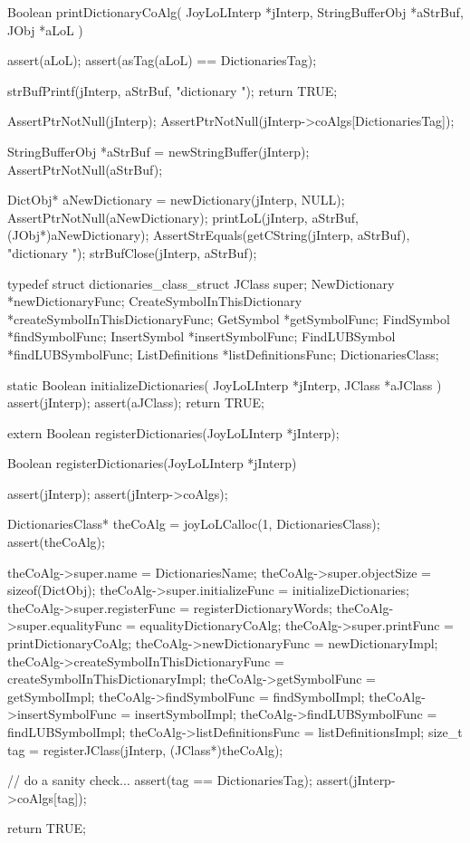 \startCCode
Boolean printDictionaryCoAlg(
  JoyLoLInterp    *jInterp,
  StringBufferObj *aStrBuf,
  JObj        *aLoL
) {
  assert(aLoL);
  assert(asTag(aLoL) == DictionariesTag);

  strBufPrintf(jInterp, aStrBuf, "dictionary ");
  return TRUE;
}
\stopCCode


\startCTest
  AssertPtrNotNull(jInterp);
  AssertPtrNotNull(jInterp->coAlgs[DictionariesTag]);

  StringBufferObj *aStrBuf = newStringBuffer(jInterp);
  AssertPtrNotNull(aStrBuf);
  
  DictObj* aNewDictionary = newDictionary(jInterp, NULL);
  AssertPtrNotNull(aNewDictionary);
  printLoL(jInterp, aStrBuf, (JObj*)aNewDictionary);
  AssertStrEquals(getCString(jInterp, aStrBuf), "dictionary ");
  strBufClose(jInterp, aStrBuf);
\stopCTest
\stopTestCase
\stopTestSuite

\startTestSuite[registerDictionaries]

\startCHeader
typedef struct dictionaries_class_struct {
  JClass           super;
  NewDictionary   *newDictionaryFunc;
  CreateSymbolInThisDictionary
                  *createSymbolInThisDictionaryFunc;
  GetSymbol       *getSymbolFunc;
  FindSymbol      *findSymbolFunc;
  InsertSymbol    *insertSymbolFunc;
  FindLUBSymbol   *findLUBSymbolFunc;
  ListDefinitions *listDefinitionsFunc;  
} DictionariesClass;

\stopCHeader

\startCCode
static Boolean initializeDictionaries(
  JoyLoLInterp *jInterp,
  JClass       *aJClass
) {
  assert(jInterp);
  assert(aJClass);
  return TRUE;
}
\stopCCode

\startCHeader
extern Boolean registerDictionaries(JoyLoLInterp *jInterp);
\stopCHeader
{}

\startCCode
Boolean registerDictionaries(JoyLoLInterp *jInterp) {
  assert(jInterp);
  assert(jInterp->coAlgs);
  
  DictionariesClass* theCoAlg
    = joyLoLCalloc(1, DictionariesClass);
  assert(theCoAlg);
  
  theCoAlg->super.name           = DictionariesName;
  theCoAlg->super.objectSize     = sizeof(DictObj);
  theCoAlg->super.initializeFunc = initializeDictionaries;
  theCoAlg->super.registerFunc   = registerDictionaryWords;
  theCoAlg->super.equalityFunc   = equalityDictionaryCoAlg;
  theCoAlg->super.printFunc      = printDictionaryCoAlg;
  theCoAlg->newDictionaryFunc    = newDictionaryImpl;
  theCoAlg->createSymbolInThisDictionaryFunc =
    createSymbolInThisDictionaryImpl;
  theCoAlg->getSymbolFunc        = getSymbolImpl;
  theCoAlg->findSymbolFunc       = findSymbolImpl;
  theCoAlg->insertSymbolFunc     = insertSymbolImpl;
  theCoAlg->findLUBSymbolFunc    = findLUBSymbolImpl;
  theCoAlg->listDefinitionsFunc  = listDefinitionsImpl;  
  size_t tag =
    registerJClass(jInterp, (JClass*)theCoAlg);
  
  // do a sanity check...
  assert(tag == DictionariesTag);
  assert(jInterp->coAlgs[tag]);
   
  return TRUE;
}
\stopCCode

